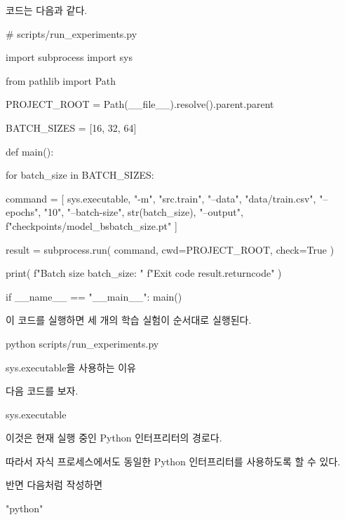 코드는 다음과 같다.

\begin{dhkcode}
# scripts/run_experiments.py

import subprocess
import sys

from pathlib import Path


PROJECT_ROOT = Path(__file__).resolve().parent.parent

BATCH_SIZES = [16, 32, 64]


def main():

    for batch_size in BATCH_SIZES:

        command = [
            sys.executable,
            "-m",
            "src.train",
            "--data",
            "data/train.csv",
            "--epochs",
            "10",
            "--batch-size",
            str(batch_size),
            "--output",
            f"checkpoints/model_bs{batch_size}.pt"
        ]

        result = subprocess.run(
            command,
            cwd=PROJECT_ROOT,
            check=True
        )

        print(
            f"Batch size {batch_size}: "
            f"Exit code {result.returncode}"
        )


if __name__ == "__main__":
    main()
\end{dhkcode}

이 코드를 실행하면 세 개의 학습 실험이 순서대로 실행된다.

\begin{dhkzsh}
python scripts/run_experiments.py
\end{dhkzsh}

\begin{dhknote}
\begin{dhksmry}[centered]
sys.executable을 사용하는 이유
\end{dhksmry}
\end{dhknote}

다음 코드를 보자.

\begin{dhkcode}
sys.executable
\end{dhkcode}

이것은 현재 실행 중인 Python 인터프리터의 경로다.

따라서 자식 프로세스에서도 동일한 Python 인터프리터를 사용하도록 할 수 있다.

반면 다음처럼 작성하면

\begin{dhkcode}
"python"
\end{dhkcode}

